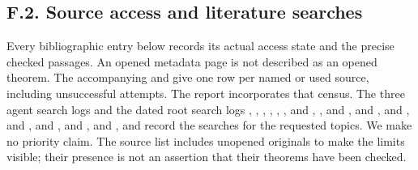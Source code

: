 \subsection{F.2. Source access and literature searches}
Every bibliographic entry below records its actual access state and the
precise checked passages. An opened metadata page is not described as
an opened theorem. The accompanying 
and  give one row per named or used source,
including unsuccessful attempts. The report incorporates that census.
The three agent search logs and the dated root search logs
, ,
, ,
, , and
, , and
, and
, and
, and
, and
, and
, and
, and
record the searches for the requested topics. We make no priority claim.
The source list includes unopened originals to make the limits visible;
their presence is not an assertion that their theorems have been checked.
